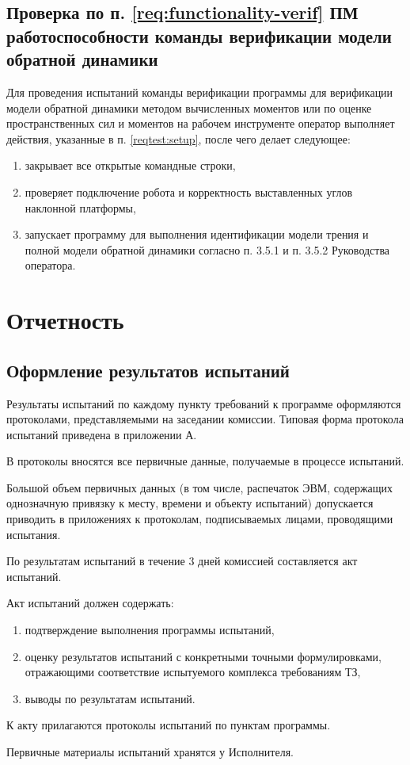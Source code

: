\subsection{Проверка по п. \ref{req:functionality-verif} ПМ  работоспособности команды верификации модели обратной динамики} \label{reqtest:functionality-verif}
Для проведения испытаний команды верификации программы \productnamesecond для верификации модели обратной динамики методом вычисленных моментов
или по оценке пространственных сил и моментов на рабочем инструменте оператор выполняет действия, указанные в п. \ref{reqtest:setup}, после чего делает следующее:
\begin{enumerate}
  \item закрывает все открытые командные строки,
  \item проверяет подключение робота и корректность выставленных углов наклонной платформы,
  \item запускает программу для выполнения идентификации модели трения и полной модели обратной динамики согласно п. 3.5.1 и п. 3.5.2 Руководства оператора.
\end{enumerate}


\newpage
\section{Отчетность}

\subsection{Оформление результатов испытаний}
Результаты испытаний по каждому пункту требований к программе оформляются протоколами, представляемыми на заседании комиссии. Типовая форма протокола испытаний приведена в приложении А.

В протоколы вносятся все первичные данные, получаемые в процессе испытаний.

Большой объем первичных данных (в том числе, распечаток ЭВМ, содержащих однозначную привязку к месту, времени и объекту испытаний) допускается приводить в приложениях к протоколам, подписываемых лицами, проводящими испытания.

По результатам испытаний в течение 3 дней комиссией составляется акт испытаний.

Акт испытаний должен содержать:
\begin{enumerate}
    \item подтверждение выполнения программы испытаний,
    \item оценку результатов испытаний с конкретными точными формулировками, отражающими соответствие испытуемого комплекса требованиям ТЗ,
    \item выводы по результатам испытаний.
\end{enumerate}

К акту прилагаются протоколы испытаний по пунктам программы.

Первичные материалы испытаний хранятся у Исполнителя.
